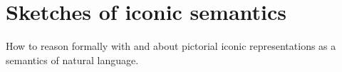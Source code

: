 



\maketitle%

\tableofcontents{}


\chapter{Sketches of iconic semantics}\label{chapter:contrel}
How to reason formally with and about pictorial iconic representations as a semantics of natural language.
%
%
%
%


\clearpage
\newpage

\clearpage
\newpage

\clearpage
\newpage

\clearpage
\newpage










